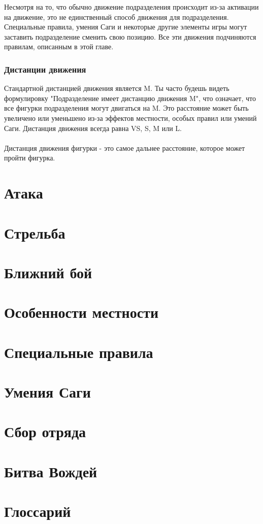 \documentclass[a4paper,11pt,twoside]{article}
\begin{document}
Несмотря на то, что обычно движение подразделения происходит из-за активации на движение, это не единственный способ движения для подразделения. Специальные правила, умения Саги и некоторые другие элементы игры могут заставить подразделение сменить свою позицию. Все эти движения подчиняются правилам, описанным в этой главе.

\section*{Дистанции движения}
Стандартной дистанцией движения является M. Ты часто будешь видеть формулировку "Подразделение имеет дистанцию движения M", что означает, что все фигурки подразделения могут двигаться на M. Это расстояние может быть увеличено или уменьшено из-за эффектов местности, особых правил или умений Саги. Дистанция движения всегда равна VS, S, M или L. \\ \\ 
Дистанция движения фигурки - это самое дальнее расстояние, которое может пройти фигурка. 

\part{Атака}
\part{Стрельба}
\part{Ближний бой}
\part{Особенности местности}
\part{Специальные правила}
\part{Умения Саги}
\part{Сбор отряда}
\part{Битва Вождей}
\part{Глоссарий}
\end{document}
